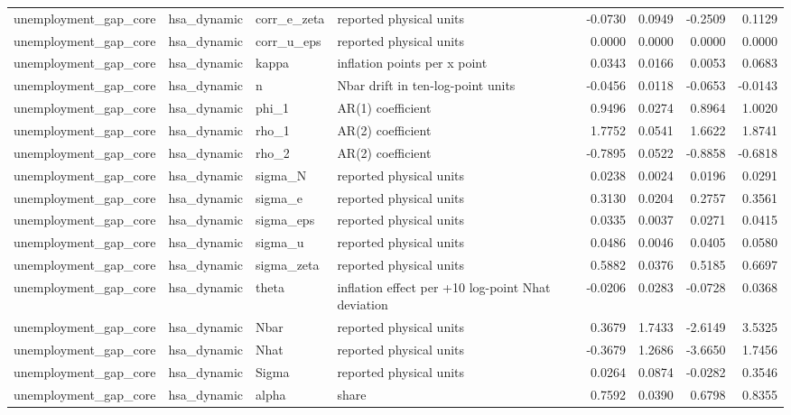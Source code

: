 \begin{tabular}{llllrrrr}
unemployment\_gap\_core & hsa\_dynamic & corr\_e\_zeta & reported physical units & -0.0730 & 0.0949 & -0.2509 & 0.1129 \\
unemployment\_gap\_core & hsa\_dynamic & corr\_u\_eps & reported physical units & 0.0000 & 0.0000 & 0.0000 & 0.0000 \\
unemployment\_gap\_core & hsa\_dynamic & kappa & inflation points per x point & 0.0343 & 0.0166 & 0.0053 & 0.0683 \\
unemployment\_gap\_core & hsa\_dynamic & n & Nbar drift in ten-log-point units & -0.0456 & 0.0118 & -0.0653 & -0.0143 \\
unemployment\_gap\_core & hsa\_dynamic & phi\_1 & AR(1) coefficient & 0.9496 & 0.0274 & 0.8964 & 1.0020 \\
unemployment\_gap\_core & hsa\_dynamic & rho\_1 & AR(2) coefficient & 1.7752 & 0.0541 & 1.6622 & 1.8741 \\
unemployment\_gap\_core & hsa\_dynamic & rho\_2 & AR(2) coefficient & -0.7895 & 0.0522 & -0.8858 & -0.6818 \\
unemployment\_gap\_core & hsa\_dynamic & sigma\_N & reported physical units & 0.0238 & 0.0024 & 0.0196 & 0.0291 \\
unemployment\_gap\_core & hsa\_dynamic & sigma\_e & reported physical units & 0.3130 & 0.0204 & 0.2757 & 0.3561 \\
unemployment\_gap\_core & hsa\_dynamic & sigma\_eps & reported physical units & 0.0335 & 0.0037 & 0.0271 & 0.0415 \\
unemployment\_gap\_core & hsa\_dynamic & sigma\_u & reported physical units & 0.0486 & 0.0046 & 0.0405 & 0.0580 \\
unemployment\_gap\_core & hsa\_dynamic & sigma\_zeta & reported physical units & 0.5882 & 0.0376 & 0.5185 & 0.6697 \\
unemployment\_gap\_core & hsa\_dynamic & theta & inflation effect per +10 log-point Nhat deviation & -0.0206 & 0.0283 & -0.0728 & 0.0368 \\
unemployment\_gap\_core & hsa\_dynamic & Nbar & reported physical units & 0.3679 & 1.7433 & -2.6149 & 3.5325 \\
unemployment\_gap\_core & hsa\_dynamic & Nhat & reported physical units & -0.3679 & 1.2686 & -3.6650 & 1.7456 \\
unemployment\_gap\_core & hsa\_dynamic & Sigma & reported physical units & 0.0264 & 0.0874 & -0.0282 & 0.3546 \\
unemployment\_gap\_core & hsa\_dynamic & alpha & share & 0.7592 & 0.0390 & 0.6798 & 0.8355 \\

\end{tabular}
